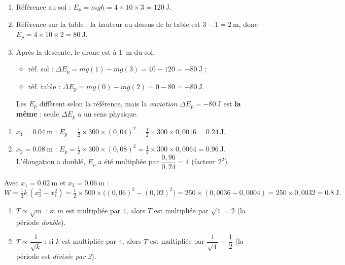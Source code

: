 \documentclass[11pt,a4paper]{article}
\begin{document}

\begin{corrige}
\begin{enumerate}[label=\alph*)]
  \item Référence au sol : $E_p=mgh=4\times10\times3=\qty{120}{\joule}$.
  \item Référence sur la table : la hauteur au-dessus de la table est $3-1=\qty{2}{\metre}$, donc
        $E_p=4\times10\times2=\qty{80}{\joule}$.
  \item Après la descente, le drone est à \qty{1}{\metre} du sol.
        \begin{itemize}[leftmargin=1.4em,topsep=1pt]
          \item réf. sol : $\Delta E_p=mg(1)-mg(3)=40-120=\qty{-80}{\joule}$ ;
          \item réf. table : $\Delta E_p=mg(0)-mg(2)=0-80=\qty{-80}{\joule}$.
        \end{itemize}
        Les $E_p$ diffèrent selon la référence, mais la \emph{variation} $\Delta E_p=\qty{-80}{\joule}$
        est \textbf{la même} : seule $\Delta E_p$ a un sens physique.
\end{enumerate}
\end{corrige}

\begin{corrige}
\begin{enumerate}[label=\alph*)]
  \item $x_1=\qty{0,04}{\metre}$ : $E_p=\tfrac12\times300\times(0,04)^2=\tfrac12\times300\times0,0016=\qty{0,24}{\joule}$.
  \item $x_2=\qty{0,08}{\metre}$ : $E_p=\tfrac12\times300\times(0,08)^2=\tfrac12\times300\times0,0064=\qty{0,96}{\joule}$.
        L'élongation a doublé, $E_p$ a été multipliée par $\dfrac{0,96}{0,24}=4$ (facteur $2^2$).
\end{enumerate}
\end{corrige}

\begin{corrige}
Avec $x_1=\qty{0,02}{\metre}$ et $x_2=\qty{0,06}{\metre}$ :
\[
W=\tfrac12 k\,(x_2^2-x_1^2)=\tfrac12\times500\times\bigl((0,06)^2-(0,02)^2\bigr)
=250\times(0,0036-0,0004)=250\times0,0032=\qty{0,8}{\joule}.
\]
\end{corrige}

\begin{corrige}
\begin{enumerate}[label=\alph*)]
  \item $T\propto\sqrt{m}$ : si $m$ est multipliée par $4$, alors $T$ est multipliée par
        $\sqrt{4}=2$ (la période \emph{double}).
  \item $T\propto\dfrac{1}{\sqrt{k}}$ : si $k$ est multipliée par $4$, alors $T$ est multipliée par
        $\dfrac{1}{\sqrt{4}}=\dfrac12$ (la période est \emph{divisée par 2}).
\end{enumerate}
\end{corrige}
\end{document}
